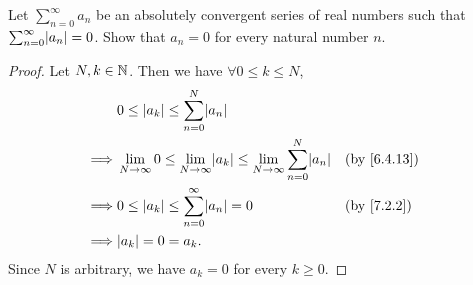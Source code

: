 \begin{ex}\label{ex:7.3.3}
  Let \(\sum_{n = 0}^\infty a_n\) be an absolutely convergent series of real numbers such that \(\sum_{n = 0}^\infty \abs{a_n} = 0\).
  Show that \(a_n = 0\) for every natural number \(n\).
\end{ex}

\begin{proof}
  Let \(N, k \in \mathbb{N}\).
  Then we have \(\forall 0 \leq k \leq N\),
  \begin{align*}
             & 0 \leq \abs{a_k} \leq \sum_{n = 0}^N \abs{a_n}                                                                                            \\
    \implies & \lim_{N \to \infty} 0 \leq \lim_{N \to \infty} \abs{a_k} \leq \lim_{N \to \infty} \sum_{n = 0}^N \abs{a_n} &  & \text{(by \cref{6.4.13})} \\
    \implies & 0 \leq \abs{a_k} \leq \sum_{n = 0}^\infty \abs{a_n} = 0                                                    &  & \text{(by \cref{7.2.2})}  \\
    \implies & \abs{a_k} = 0 = a_k.
  \end{align*}
  Since \(N\) is arbitrary, we have \(a_k = 0\) for every \(k \geq 0\).
\end{proof}